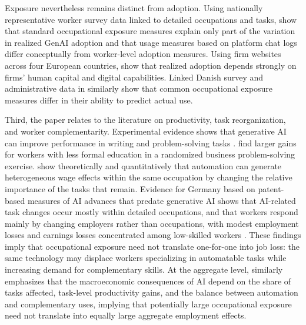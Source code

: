 \documentclass[11pt]{article}
\begin{document}
Exposure nevertheless remains distinct from adoption. Using nationally representative worker survey data linked to detailed occupations and tasks, \citet{bick_et_al_2026} show that standard occupational exposure measures explain only part of the variation in realized GenAI adoption and that usage measures based on platform chat logs differ conceptually from worker-level adoption measures. Using firm websites across four European countries, \citet{garbers_gregory_2026} show that realized adoption depends strongly on firms' human capital and digital capabilities. Linked Danish survey and administrative data in \citet{pulito_et_al_2026} similarly show that common occupational exposure measures differ in their ability to predict actual use.


Third, the paper relates to the literature on productivity, task reorganization, and worker complementarity. Experimental evidence shows that generative AI can improve performance in writing and problem-solving tasks \citep{noy_zhang_2023}. \citet{cruces_et_al_2026} find larger gains for workers with less formal education in a randomized business problem-solving exercise. \citet{freund_mann_2026} show theoretically and quantitatively that automation can generate heterogeneous wage effects within the same occupation by changing the relative importance of the tasks that remain. Evidence for Germany based on patent-based measures of AI advances that predate generative AI shows that AI-related task changes occur mostly within detailed occupations, and that workers respond mainly by changing employers rather than occupations, with modest employment losses and earnings losses concentrated among low-skilled workers \citep{gathmann2024ai}. These findings imply that occupational exposure need not translate one-for-one into job loss: the same technology may displace workers specializing in automatable tasks while increasing demand for complementary skills. At the aggregate level, \citet{acemoglu_2025} similarly emphasizes that the macroeconomic consequences of AI depend on the share of tasks affected, task-level productivity gains, and the balance between automation and complementary uses, implying that potentially large occupational exposure need not translate into equally large aggregate employment effects.
\end{document}
